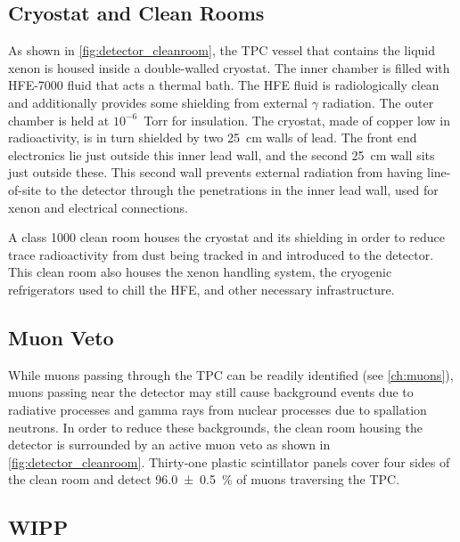 \documentclass[herrin-thesis.tex]{subfiles}
\begin{document}
\subsection{Cryostat and Clean Rooms}
As shown in \cref{fig:detector_cleanroom}, the TPC vessel that contains the liquid xenon is housed inside a double-walled cryostat. The inner chamber is filled with HFE-7000 \cite{hfe7000} fluid that acts a thermal bath. The HFE fluid is radiologically clean and additionally provides some shielding from external \(\gamma\) radiation. The outer chamber is held at \(10^{-6}\)~\si{Torr} for insulation. The cryostat, made of copper low in radioactivity, is in turn shielded by two \SI{25}{\cm} walls of lead. The front end electronics lie just outside this inner lead wall, and the second \SI{25}{\cm} wall sits just outside these. This second wall prevents external radiation from having line-of-site to the detector through the penetrations in the inner lead wall, used for xenon and electrical connections.

A class 1000 clean room houses the cryostat and its shielding in order to reduce trace radioactivity from dust being tracked in and introduced to the detector. This clean room also houses the xenon handling system, the cryogenic refrigerators used to chill the HFE, and other necessary infrastructure.

\subsection{Muon Veto}
While muons passing through the TPC can be readily identified (see \cref{ch:muons}), muons passing near the detector may still cause background events due to radiative processes and gamma rays from nuclear processes due to spallation neutrons. In order to reduce these backgrounds, the clean room housing the detector is surrounded by an active muon veto as shown in \cref{fig:detector_cleanroom}. Thirty-one plastic scintillator panels cover four sides of the clean room and detect \SI{96.0\pm0.5}{\%} of muons traversing the TPC.

\subsection{WIPP}
\end{document}
